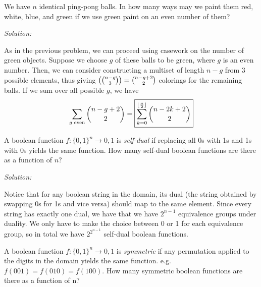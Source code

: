\documentclass[12pt]{scrartcl}
\newenvironment{problem}[2][Problem]{\begin{trivlist}
\item[\hskip \labelsep {\bfseries #1}\hskip \labelsep {\bfseries #2.}]}{\end{trivlist}}
\newenvironment{solution}
    {\emph{Solution:}
    }
    {
    \qedhere
    }
\begin{document}

\begin{problem}{7}
We have $n$ identical ping-pong balls. In how many ways may we paint them red, white, blue, and green if we use green paint on an even number of them?
\end{problem}

\begin{solution}
As in the previous problem, we can proceed using casework on the number of green objects. Suppose we choose $g$ of these balls to be green, where $g$ is an even number. Then, we can consider constructing a multiset of length $n-g$ from 3 possible elements, thus giving $\left(\binom{n-g}{3}\right) = \binom{n-g+2}{2}$ colorings for the remaining balls. If we sum over all possible $g$, we have
\[
	\sum_{g \text{ even}} \binom{n-g+2}{2}  = \boxed{\sum_{k=0}^{\lfloor\frac{n}{2}\rfloor} \binom{n-2k+2}{2}}
\]
\end{solution}


\begin{problem}{8}
A boolean function $f : \{0, 1 \}^n \rightarrow 0, 1$ is \textit{self-dual} if replacing all 0s with 1s and 1s with 0s yields the same function. How many self-dual boolean functions are there as a function of $n$?
\end{problem}

\begin{solution}
Notice that for any boolean string in the domain, its dual (the string obtained by swapping 0s for 1s and vice versa) should map to the same element. Since every string has exactly one dual, we have that we have $2^{n-1}$ equivalence groups under duality. We only have to make the choice between 0 or 1 for each equivalence group, so in total we have $\boxed{2^{2^{n-1}}}$ self-dual boolean functions. 
\end{solution}

% 

\begin{problem}{9}
A boolean function $f : \{0, 1 \}^n \rightarrow 0, 1$ is \textit{symmetric} if any permutation applied to the digits in the domain yields the same function. e.g. $f(001) = f(010) = f(100)$. How many symmetric boolean functions are there as a function of n?
\end{problem}
\end{document}
